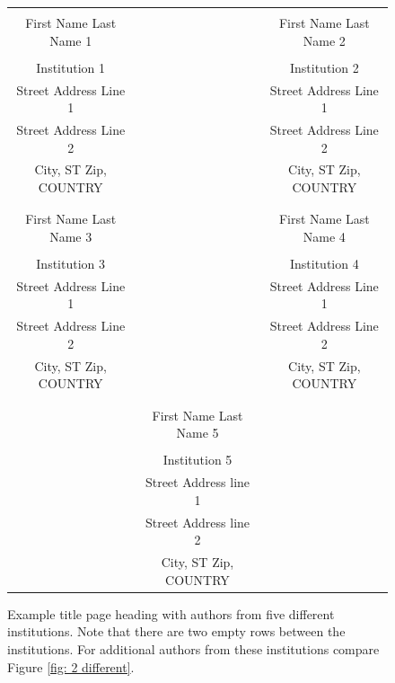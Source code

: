 \documentclass{article}
\begin{document}
\begin{figure}[htb]
{
\centering
\begin{tabular}{ccc}
\phantom{Adjust spacing using these entries} & \phantom{intermediate space} & \phantom{Adjust spacing using these entries} \\
First Name Last Name 1 & & First Name Last Name 2 \\
\\
Institution 1 & & Institution 2 \\
Street Address Line 1 & & Street Address Line 1 \\
Street Address Line 2 & & Street Address Line 2 \\
City, ST Zip, COUNTRY & & City, ST Zip, COUNTRY \\
\\ \\
First Name Last Name 3 & & First Name Last Name 4 \\
\\
Institution 3 & & Institution 4 \\
Street Address Line 1 & & Street Address Line 1 \\
Street Address Line 2 & & Street Address Line 2 \\
City, ST Zip, COUNTRY & & City, ST Zip, COUNTRY \\
\\
\\
& First Name Last Name 5 \\
\\
& Institution 5\\
& Street Address line 1 \\
& Street Address line 2 \\
& City, ST Zip, COUNTRY
\end{tabular}
\caption{Example title page heading with authors from five different institutions. Note that there are two empty rows between the institutions. For additional authors from these institutions compare Figure \ref{fig: 2 different}. \label{fig: 5 different}}
}
\end{figure}
\end{document}
